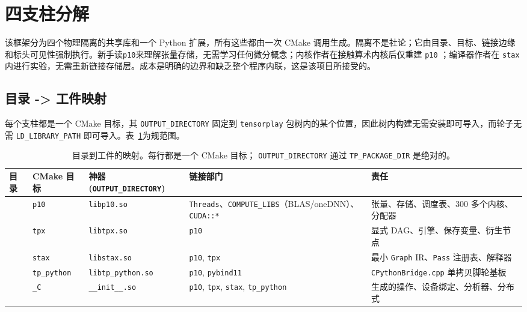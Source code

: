 \section{四支柱分解}
\label{sec:arch}

该框架分为四个物理隔离的共享库和一个 Python 扩展，所有这些都由一次 CMake 调用生成。隔离不是社论；它由目录、目标、链接边缘和标头可见性强制执行。新手读\texttt{p10}来理解张量存储，无需学习任何微分概念；内核作者在接触算术内核后仅重建 \texttt{p10} ；编译器作者在 \texttt{stax} 内进行实验，无需重新链接存储层。成本是明确的边界和缺乏整个程序内联，这是该项目所接受的。

\subsection{目录 \texorpdfstring{->}{->} 工件映射}
\label{sec:arch:mapping}

每个支柱都是一个 CMake 目标，其 \texttt{OUTPUT\_DIRECTORY} 固定到 \texttt{tensorplay} 包树内的某个位置，因此树内构建无需安装即可导入，而轮子无需 \texttt{LD\_LIBRARY\_PATH} 即可导入。表~\ref{tab:pillars}为规范图。

\begin{table}[H]
\centering
\caption{目录到工件的映射。每行都是一个 CMake 目标； \texttt{OUTPUT\_DIRECTORY} 通过 \texttt{TP\_PACKAGE\_DIR} 是绝对的。}
\label{tab:pillars}
\small
\begin{tabular}{p{1.8cm}p{1.6cm}p{2.8cm}p{3.4cm}p{2.6cm}}
\toprule
目录 & CMake 目标 & 神器 (\texttt{OUTPUT\_DIRECTORY}) & 链接部门 & 责任 \\
\midrule
  & \texttt{p10} & \texttt{libp10.so} & \texttt{Threads}、\texttt{COMPUTE\_LIBS}（BLAS/oneDNN）、\texttt{CUDA::*} & 张量、存储、调度表、300 多个内核、分配器 \\
  & \texttt{tpx} & \texttt{libtpx.so} & \texttt{p10} & 显式 DAG、引擎、保存变量、衍生节点 \\
  & \texttt{stax} & \texttt{libstax.so} & \texttt{p10}, \texttt{tpx} & 最小 \texttt{Graph} IR、\texttt{Pass} 注册表、解释器 \\
  & \texttt{tp\_python} & \texttt{libtp\_python.so} & \texttt{p10}, \texttt{pybind11} & \texttt{CPythonBridge.cpp} 单拷贝脚轮基板 \\
  & \texttt{\_C} & \texttt{\_\_init\_\_.so} & \texttt{p10}, \texttt{tpx}, \texttt{stax}, \texttt{tp\_python} & 生成的操作、设备绑定、分析器、分布式 \\
\bottomrule
\end{tabular}
\end{table}

